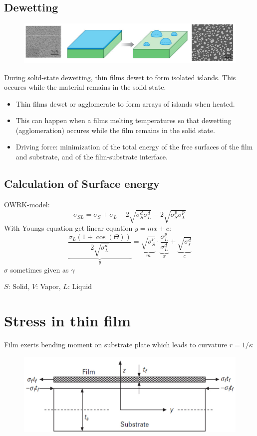 \subsection{Dewetting}
\begin{figure}[h]
    \centering
    \includegraphics[width=\columnwidth]{images/dewetting.png}
    \label{fig:dewetting}
\end{figure}
During solid-state dewetting, thin films dewet to form isolated islands. This occures while the material remains in the solid state.
\begin{itemize}
    \item Thin films dewet or agglomerate to form arrays of islands when heated.
    \item This can happen when a films melting temperatures so that dewetting (agglomeration) occures while the film remains in the solid state.
    \item Driving force: minimization of the total energy of the free surfaces of the film and substrate, and of the film-substrate interface.
\end{itemize}

\subsection{Calculation of Surface energy}
OWRK-model:
\[
\sigma_{SL} = \sigma_{S} + \sigma_{L} - 2\sqrt{\sigma_S^d\sigma_L^d} - 2\sqrt{\sigma_S^p\sigma_L^p}
\]
With Youngs equation get linear equation \(y = mx + c\):
\[
\underbrace{\frac{\sigma_L (1+\cos(\Theta))}{2\sqrt{\sigma_L^d}}}_{y} 
= 
\underbrace{\sqrt{\sigma_S^p}}_{m}
\cdot
\underbrace{\frac{\sigma_L^p}{\sigma_L^d}}_{x} 
+ 
\underbrace{\sqrt{\sigma_s^d}}_{c}
\]
\(\sigma\) sometimes given as \(\gamma\)

\(S\): Solid, \(V\): Vapor, \(L\): Liquid
\section{Stress in thin film}

Film exerts bending moment on substrate plate which leads to curvature \(r = 1 / \kappa\)
\begin{figure}[!ht]
    \centering
    \includegraphics[width=\columnwidth]{images/stoney.png}
    \label{fig:stoney}
\end{figure}

